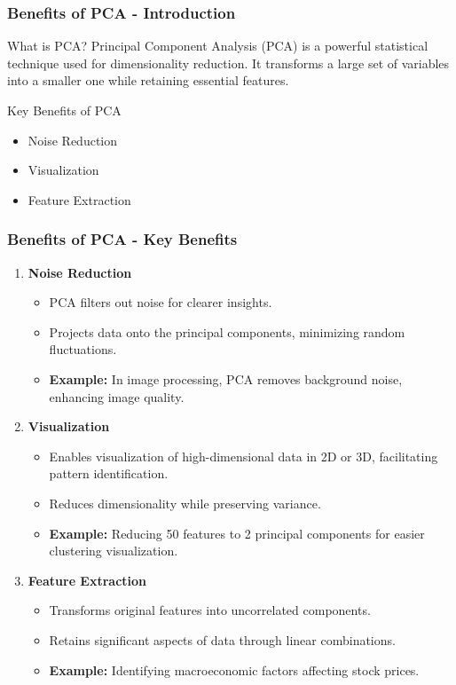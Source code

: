 \documentclass[aspectratio=169]{beamer}
\begin{document}
\begin{frame}[fragile]
  \frametitle{Benefits of PCA - Introduction}
  \begin{block}{What is PCA?}
    Principal Component Analysis (PCA) is a powerful statistical technique used for dimensionality reduction. It transforms a large set of variables into a smaller one while retaining essential features.
  \end{block}
  \begin{block}{Key Benefits of PCA}
    \begin{itemize}
      \item Noise Reduction
      \item Visualization
      \item Feature Extraction
    \end{itemize}
  \end{block}
\end{frame}

\begin{frame}[fragile]
  \frametitle{Benefits of PCA - Key Benefits}
  \begin{enumerate}
    \item \textbf{Noise Reduction}
      \begin{itemize}
        \item PCA filters out noise for clearer insights.
        \item Projects data onto the principal components, minimizing random fluctuations.
        \item \textbf{Example:} In image processing, PCA removes background noise, enhancing image quality.
      \end{itemize}
    
    \item \textbf{Visualization}
      \begin{itemize}
        \item Enables visualization of high-dimensional data in 2D or 3D, facilitating pattern identification.
        \item Reduces dimensionality while preserving variance.
        \item \textbf{Example:} Reducing 50 features to 2 principal components for easier clustering visualization.
      \end{itemize}

    \item \textbf{Feature Extraction}
      \begin{itemize}
        \item Transforms original features into uncorrelated components.
        \item Retains significant aspects of data through linear combinations.
        \item \textbf{Example:} Identifying macroeconomic factors affecting stock prices.
      \end{itemize}
  \end{enumerate}
\end{frame}
\end{document}
